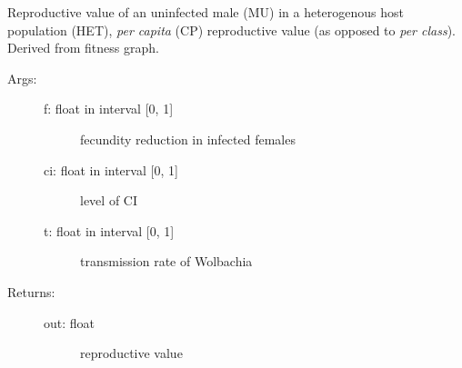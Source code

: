 \documentclass[letterpaper,10pt,english]{sphinxmanual}
\begin{document}
\begin{fulllineitems}
\label{index:wspec.analytical.reproval_MUHETCP}
Reproductive value of an uninfected male (MU) in a heterogenous 
host population (HET), \emph{per capita} (CP) reproductive value (as 
opposed to \emph{per class}). Derived from fitness graph.
\begin{description}
\item[{Args:}] \leavevmode\begin{description}
\item[{f: float in interval {[}0, 1{]}}] \leavevmode
fecundity reduction in infected females

\item[{ci: float in interval {[}0, 1{]}}] \leavevmode
level of CI

\item[{t: float in interval {[}0, 1{]}}] \leavevmode
transmission rate of Wolbachia

\end{description}

\item[{Returns:}] \leavevmode\begin{description}
\item[{out: float}] \leavevmode
reproductive value

\end{description}

\end{description}

\end{fulllineitems}

\end{document}
